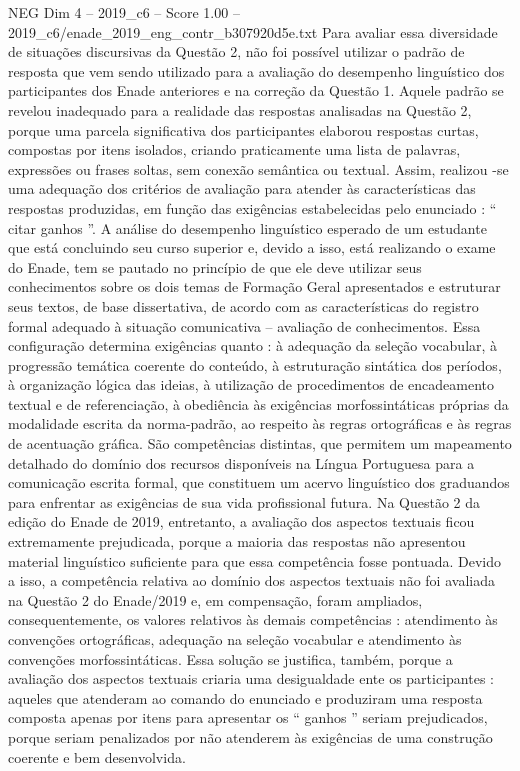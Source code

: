 \begin{textsample}{NEG Dim 4 – 2019\_c6 – Score 1.00 – 2019\_c6/enade\_2019\_eng\_contr\_b307920d5e.txt}
Para avaliar essa diversidade de situações discursivas da Questão 2, não foi possível utilizar o padrão de resposta que vem sendo utilizado para a avaliação do desempenho linguístico dos participantes dos Enade anteriores e na correção da Questão 1.
Aquele padrão se revelou inadequado para a realidade das respostas analisadas na Questão 2, porque uma parcela significativa dos participantes elaborou respostas curtas, compostas por itens isolados, criando praticamente uma lista de palavras, expressões ou frases soltas, sem conexão semântica ou textual.
Assim, realizou -se uma adequação dos critérios de avaliação para atender às características das respostas produzidas, em função das exigências estabelecidas pelo enunciado : “ citar ganhos ”.
A análise do desempenho linguístico esperado de um estudante que está concluindo seu curso superior e, devido a isso, está realizando o exame do Enade, tem se pautado no princípio de que ele deve utilizar seus conhecimentos sobre os dois temas de Formação Geral apresentados e estruturar seus textos, de base dissertativa, de acordo com as características do registro formal adequado à situação comunicativa – avaliação de conhecimentos.
Essa configuração determina exigências quanto : à adequação da seleção vocabular, à progressão temática coerente do conteúdo, à estruturação sintática dos períodos, à organização lógica das ideias, à utilização de procedimentos de encadeamento textual e de referenciação, à obediência às exigências morfossintáticas próprias da modalidade escrita da norma-padrão, ao respeito às regras ortográficas e às regras de acentuação gráfica.
São competências distintas, que permitem um mapeamento detalhado do domínio dos recursos disponíveis na Língua Portuguesa para a comunicação escrita formal, que constituem um acervo linguístico dos graduandos para enfrentar as exigências de sua vida profissional futura.
Na Questão 2 da edição do Enade de 2019, entretanto, a avaliação dos aspectos textuais ficou extremamente prejudicada, porque a maioria das respostas não apresentou material linguístico suficiente para que essa competência fosse pontuada.
Devido a isso, a competência relativa ao domínio dos aspectos textuais não foi avaliada na Questão 2 do Enade/2019 e, em compensação, foram ampliados, consequentemente, os valores relativos às demais competências : atendimento às convenções ortográficas, adequação na seleção vocabular e atendimento às convenções morfossintáticas.
Essa solução se justifica, também, porque a avaliação dos aspectos textuais criaria uma desigualdade ente os participantes : aqueles que atenderam ao comando do enunciado e produziram uma resposta composta apenas por itens para apresentar os “ ganhos ” seriam prejudicados, porque seriam penalizados por não atenderem às exigências de uma construção coerente e bem desenvolvida.

\end{textsample}
